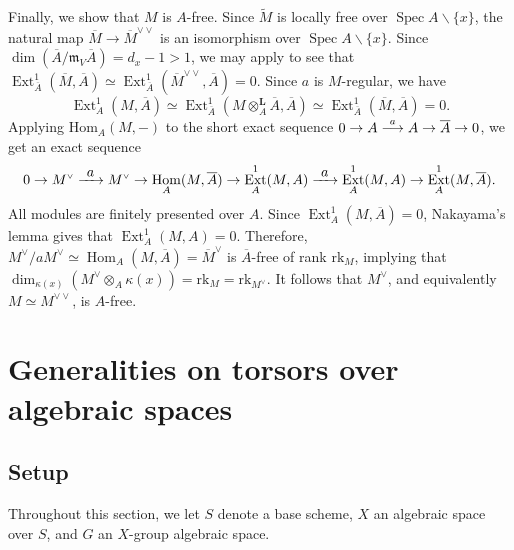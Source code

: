 \documentclass[JEP,XML,SOM,Unicode,published]{cedram}
\newcommand\To[1]{\mathchoice{\xrightarrow{\textstyle\kern4pt#1\kern3pt}}{\stackrel{#1}{\longrightarrow}}{}{}}
\let\oldvee\vee
\renewcommand{\vee}{{\scriptscriptstyle\oldvee}}
\let\backslash\smallsetminus
\let\ra\rightarrow
\let\ov\overline
\newcommand{\ddual}{\vee\vee}
\DeclareMathOperator{\Spec}{Spec}
\DeclareMathOperator{\Hom}{Hom}
\DeclareMathOperator{\Ext}{Ext}
\theoremstyle{plain}
\theoremstyle{definition}
\begin{document}
Finally, we show that $M$ is $A$-free. Since $\widetilde{M}$ is locally free over $\Spec A\backslash \{x\}$, the natural map $\overline{M} \to \overline{M}^{\ddual}$ is an isomorphism over $\Spec A\backslash \{x\}$. Since $\dim(\overline{A}/\mathfrak{m}_V\overline{A})=d_x-1>1$, we may apply  to see that $\Ext_{\overline{A}}^1(\overline{M},\overline{A}) \simeq \Ext_{\overline{A}}^1(\overline{M}^{\ddual},\overline{A}) =0$. Since $a$ is $M$-regular, we have
\[
\Ext_A^1(M,\overline{A}) \simeq
\Ext_{\overline{A}}^1(M\otimes_A^{\textbf{L}}\overline{A},\overline{A})
\simeq
\Ext_{\overline{A}}^1(\overline{M},\overline{A})=0.
\]
Applying Hom$_{A}(M,-)$ to the short exact sequence $0\to A\To{a} A \to \overline{A}\to 0$, we get an exact sequence
\[
0 \ra M^{\vee} \To{a} M^{\vee} \ra \Hom _A(M,\ov{A}) \ra \Ext_A^1(M,A)
\To{a} \Ext_A^1(M,A) \ra \Ext_A^1(M,\ov{A}).
\]
All modules are finitely presented over $A$. Since $\Ext_A^1(M,\overline{A})=0$, Nakayama's lemma gives that $\Ext_A^1(M,A)=0$.
{Therefore, $M^{\vee}/aM^{\vee}\simeq \Hom _A(M,\overline{A}) = \overline{M}^{\vee}$ is $\overline{A}$-free of rank $\mathrm{rk}_M$, implying that $\dim_{\kappa(x)}(M^{\vee}\otimes_A \kappa(x))=\mathrm{rk}_M=\mathrm{rk}_{M^{\vee}}$.} It follows that $M^{\vee}$, and equivalently $M\simeq M^{\ddual}$, is $A$-free.

\section{Generalities on torsors over algebraic spaces}

\subsection{Setup}\label{situation on S,X,G}
Throughout this section, we let $S$ denote a base scheme, $X$ an algebraic space over $S$, and $G$ an $X$-group algebraic space.
\end{document}

